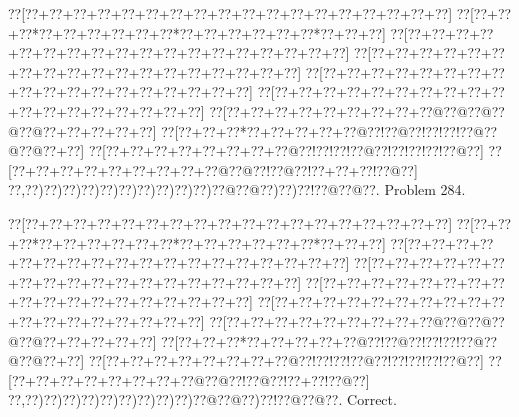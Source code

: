 \documentclass[a5paper]{article}
\begin{document}
\begin{center}
{\goo
\0??[\0??+\0??+\0??+\0??+\0??+\0??+\0??+\0??+\0??+\0??+\0??+\0??+\0??+\0??+\0??+\0??+\0??+\0??]
\0??[\0??+\0??+\0??*\0??+\0??+\0??+\0??+\0??+\0??*\0??+\0??+\0??+\0??+\0??+\0??*\0??+\0??+\0??]
\0??[\0??+\0??+\0??+\0??+\0??+\0??+\0??+\0??+\0??+\0??+\0??+\0??+\0??+\0??+\0??+\0??+\0??+\0??]
\0??[\0??+\0??+\0??+\0??+\0??+\0??+\0??+\0??+\0??+\0??+\0??+\0??+\0??+\0??+\0??+\0??+\0??+\0??]
\0??[\0??+\0??+\0??+\0??+\0??+\0??+\0??+\0??+\0??+\0??+\0??+\0??+\0??+\0??+\0??+\0??+\0??+\0??]
\0??[\0??+\0??+\0??+\0??+\0??+\0??+\0??+\0??+\0??+\0??+\0??+\0??+\0??+\0??+\0??+\0??+\0??+\0??]
\0??[\0??+\0??+\0??+\0??+\0??+\0??+\0??+\0??+\0??@\0??@\0??@\0??@\0??@\0??+\0??+\0??+\0??+\0??]
\0??[\0??+\0??+\0??*\0??+\0??+\0??+\0??+\0??@\0??!\0??@\0??!\0??!\0??!\0??@\0??@\0??@\0??+\0??]
\0??[\0??+\0??+\0??+\0??+\0??+\0??+\0??+\0??@\0??!\0??!\0??!\0??@\0??!\0??!\0??!\0??!\0??@\0??]
\0??[\0??+\0??+\0??+\0??+\0??+\0??+\0??+\0??+\0??@\0??@\0??!\0??@\0??!\0??+\0??+\0??!\0??@\0??]
\0??,\0??)\0??)\0??)\0??)\0??)\0??)\0??)\0??)\0??)\0??)\0??@\0??@\0??)\0??)\0??!\0??@\0??@\0??.
}
Problem 284.

\end{center}
\begin{center}
{\goo
\0??[\0??+\0??+\0??+\0??+\0??+\0??+\0??+\0??+\0??+\0??+\0??+\0??+\0??+\0??+\0??+\0??+\0??+\0??]
\0??[\0??+\0??+\0??*\0??+\0??+\0??+\0??+\0??+\0??*\0??+\0??+\0??+\0??+\0??+\0??*\0??+\0??+\0??]
\0??[\0??+\0??+\0??+\0??+\0??+\0??+\0??+\0??+\0??+\0??+\0??+\0??+\0??+\0??+\0??+\0??+\0??+\0??]
\0??[\0??+\0??+\0??+\0??+\0??+\0??+\0??+\0??+\0??+\0??+\0??+\0??+\0??+\0??+\0??+\0??+\0??+\0??]
\0??[\0??+\0??+\0??+\0??+\0??+\0??+\0??+\0??+\0??+\0??+\0??+\0??+\0??+\0??+\0??+\0??+\0??+\0??]
\0??[\0??+\0??+\0??+\0??+\0??+\0??+\0??+\0??+\0??+\0??+\0??+\0??+\0??+\0??+\0??+\0??+\0??+\0??]
\0??[\0??+\0??+\0??+\0??+\0??+\0??+\0??+\0??+\0??@\0??@\0??@\0??@\0??@\0??+\0??+\0??+\0??+\0??]
\0??[\0??+\0??+\0??*\0??+\0??+\0??+\0??+\0??@\0??!\0??@\0??!\0??!\0??!\0??@\0??@\0??@\0??+\0??]
\0??[\0??+\0??+\0??+\0??+\0??+\0??+\0??+\0??@\0??!\0??!\0??!\0??@\0??!\0??!\0??!\0??!\0??@\0??]
\0??[\0??+\0??+\0??+\0??+\0??+\0??+\0??+\0??@\0??@\0??!\0??@\0??!\0??+\0??!\0??@\0??]
\0??,\0??)\0??)\0??)\0??)\0??)\0??)\0??)\0??)\0??)\0??@\0??@\0??)\0??!\0??@\0??@\0??.
}
Correct. 

\end{center}
\end{document}
